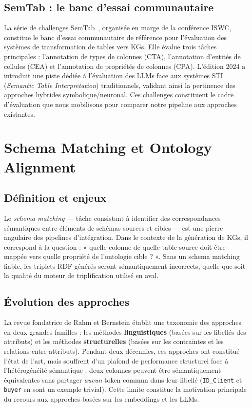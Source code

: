 \subsection{SemTab : le banc d'essai communautaire}
La série de challenges SemTab~\cite{semtab2024, semtab2023}, organisée en marge de la conférence ISWC, constitue le banc d'essai communautaire de référence pour l'évaluation des systèmes de transformation de tables vers KGs. Elle évalue trois tâches principales : l'annotation de types de colonnes (CTA), l'annotation d'entités de cellules (CEA) et l'annotation de propriétés de colonnes (CPA). L'édition 2024 a introduit une piste dédiée à l'évaluation des LLMs face aux systèmes STI (\textit{Semantic Table Interpretation}) traditionnels, validant ainsi la pertinence des approches hybrides symbolique/neuronal. Ces challenges constituent le cadre d'évaluation que nous mobilisons pour comparer notre pipeline aux approches existantes.

\section{Schema Matching et Ontology Alignment}\label{sec:schema_matching}
\subsection{Définition et enjeux}
Le \textit{schema matching} — tâche consistant à identifier des correspondances sémantiques entre éléments de schémas sources et cibles — est une pierre angulaire des pipelines d'intégration. Dans le contexte de la génération de KGs, il correspond à la question : « quelle colonne de quelle table source doit être mappée vers quelle propriété de l'ontologie cible ? ». Sans un schema matching fiable, les triplets RDF générés seront sémantiquement incorrects, quelle que soit la qualité du moteur de triplification utilisé en aval.

\subsection{Évolution des approches}
La revue fondatrice de Rahm et Bernstein établit une taxonomie des approches en deux grandes familles : les méthodes \textbf{linguistiques} (basées sur les libellés des attributs) et les méthodes \textbf{structurelles} (basées sur les contraintes et les relations entre attributs). Pendant deux décennies, ces approches ont constitué l'état de l'art, mais souffrent d'un plafond de performance structurel face à l'hétérogénéité sémantique : deux colonnes peuvent être sémantiquement équivalentes sans partager \textit{aucun} token commun dans leur libellé (\texttt{ID\_Client} et \texttt{buyer} en sont un exemple trivial). Cette limite constitue la motivation principale du recours aux approches basées sur les embeddings et les LLMs.

